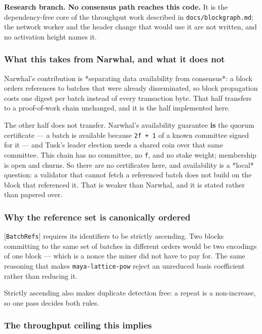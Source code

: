 \documentclass[11pt,a4paper]{article}
\begin{document}
\textbf{Research branch. No consensus path reaches this code.} It is the
dependency-free core of the throughput work described in
\texttt{docs/blockgraph.md}; the network worker and the header change that would
use it are not written, and no activation height names it.

\subsubsection{What this takes from Narwhal, and what it does not}

Narwhal's contribution is *separating data availability from consensus*: a
block orders references to batches that were already disseminated, so block
propagation costs one digest per batch instead of every transaction byte.
That half transfers to a proof-of-work chain unchanged, and it is the half
implemented here.

The other half does not transfer. Narwhal's availability guarantee \textbf{is} the
quorum certificate — a batch is available because \texttt{2f + 1} of a known
committee signed for it — and Tusk's leader election needs a shared coin over
that same committee. This chain has no committee, no \texttt{f}, and no stake
weight; membership is open and churns. So there are no certificates here, and
availability is a *local* question: a validator that cannot fetch a
referenced batch does not build on the block that referenced it. That is
weaker than Narwhal, and it is stated rather than papered over.

\subsubsection{Why the reference set is canonically ordered}

[\texttt{BatchRefs}] requires its identifiers to be strictly ascending. Two blocks
committing to the same set of batches in different orders would be two
encodings of one block — which is a nonce the miner did not have to pay for.
The same reasoning that makes \texttt{maya-lattice-pow} reject an unreduced basis
coefficient rather than reducing it.

Strictly ascending also makes duplicate detection free: a repeat is a
non-increase, so one pass decides both rules.

\subsubsection{The throughput ceiling this implies}
\end{document}
